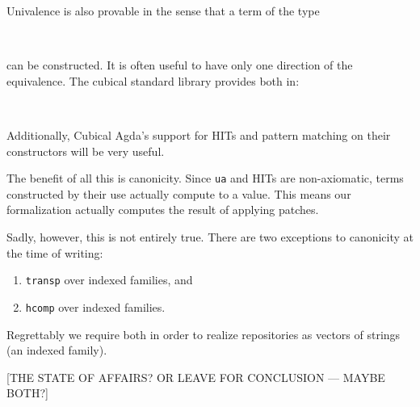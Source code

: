Univalence is also provable in the sense that a term of the type
\begin{code}[hide]%
\>[0]\<%
\\
\>[0][@{}l@{\AgdaIndent{0}}]%
\>[2]\AgdaSpace{}%
\AgdaSymbol{:}\<%
\end{code}
\begin{code}%
\>[2][@{}l@{\AgdaIndent{1}}]%
\>[4]\AgdaSymbol{\{}\AgdaSpace{}%
\AgdaSpace{}%
\AgdaSymbol{:}\AgdaSpace{}%
\AgdaSymbol{\}}\AgdaSpace{}%
\AgdaSpace{}%
\AgdaSymbol{(}\AgdaSpace{}%
\AgdaSpace{}%
\AgdaSymbol{)}\AgdaSpace{}%
\AgdaSpace{}%
\AgdaSymbol{(}\AgdaSpace{}%
\AgdaSpace{}%
\AgdaSymbol{)}\<%
\end{code}
can be constructed.
It is often useful to have only one direction of the equivalence.
The cubical standard library provides both in:
\begin{code}%
%
\>[2]%
\>[14]\AgdaSymbol{:}\AgdaSpace{}%
\AgdaSymbol{\{}\AgdaSpace{}%
\AgdaSpace{}%
\AgdaSymbol{:}\AgdaSpace{}%
\AgdaSymbol{\}}\AgdaSpace{}%
\AgdaSpace{}%
\AgdaSpace{}%
\AgdaSpace{}%
\AgdaSpace{}%
\AgdaSpace{}%
\AgdaSpace{}%
\AgdaSpace{}%
\<%
\\
%
\>[2]\AgdaSpace{}%
\AgdaSymbol{:}\AgdaSpace{}%
\AgdaSymbol{\{}\AgdaSpace{}%
\AgdaSpace{}%
\AgdaSymbol{:}\AgdaSpace{}%
\AgdaSymbol{\}}\AgdaSpace{}%
\AgdaSpace{}%
\AgdaSpace{}%
\AgdaSpace{}%
\AgdaSpace{}%
\AgdaSpace{}%
\AgdaSpace{}%
\AgdaSpace{}%
\<%
\end{code}

Additionally, Cubical Agda's support for HITs and pattern matching on their
constructors will be very useful.

The benefit of all this is canonicity. Since \texttt{ua} and HITs are non-axiomatic,
terms constructed by their use actually compute to a value. This means our
formalization actually computes the result of applying patches.

Sadly, however, this is not entirely true.
There are two exceptions to canonicity at the time of writing:
\begin{enumerate}
  \item \texttt{transp} over indexed families, and
  \item \texttt{hcomp} over indexed families.
\end{enumerate}

Regrettably we require both in order to realize repositories as vectors of strings
(an indexed family).

[THE STATE OF AFFAIRS? OR LEAVE FOR CONCLUSION — MAYBE BOTH?]
